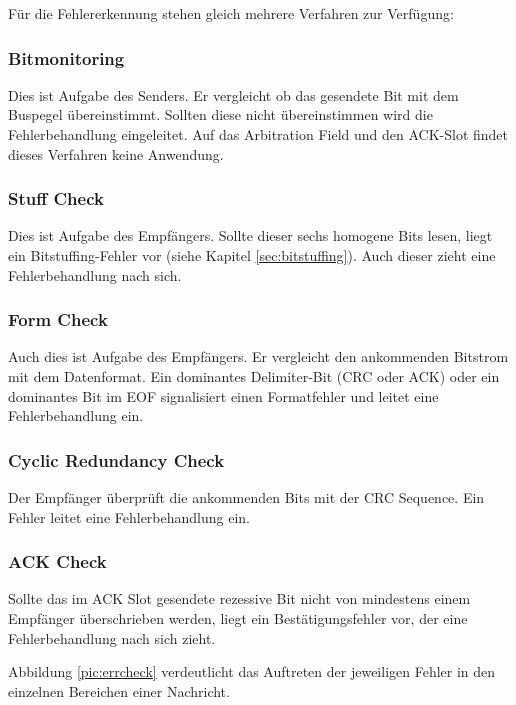 Für die Fehlererkennung stehen gleich mehrere Verfahren zur Verfügung:

\subsubsection{Bitmonitoring}

Dies ist Aufgabe des Senders. Er vergleicht ob das gesendete Bit mit dem Buspegel übereinstimmt. 
Sollten diese nicht übereinstimmen wird die Fehlerbehandlung eingeleitet. Auf das Arbitration Field 
und den ACK-Slot findet dieses Verfahren keine Anwendung.

\subsubsection{Stuff Check}

Dies ist Aufgabe des Empfängers. Sollte dieser sechs homogene Bits lesen, liegt ein Bitstuffing-Fehler 
vor (siehe Kapitel \ref{sec:bitstuffing}). Auch dieser zieht eine Fehlerbehandlung nach sich.

\subsubsection{Form Check}

Auch dies ist Aufgabe des Empfängers. Er vergleicht den ankommenden Bitstrom mit dem Datenformat.
Ein dominantes Delimiter-Bit (CRC oder ACK) oder ein dominantes Bit im EOF signalisiert einen 
Formatfehler und leitet eine Fehlerbehandlung ein.

\subsubsection{Cyclic Redundancy Check}

Der Empfänger überprüft die ankommenden Bits mit der CRC Sequence. Ein Fehler leitet eine 
Fehlerbehandlung ein.

\subsubsection{ACK Check}
	
Sollte das im ACK Slot gesendete rezessive Bit nicht von mindestens einem Empfänger überschrieben 
werden, liegt ein Bestätigungsfehler vor, der eine Fehlerbehandlung nach sich zieht.

Abbildung \ref{pic:errcheck} verdeutlicht das Auftreten der jeweiligen Fehler in den einzelnen Bereichen
einer Nachricht.


